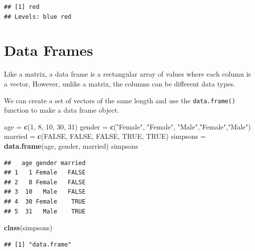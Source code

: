\documentclass[
]{book}
\newenvironment{Shaded}{\begin{snugshade}}{\end{snugshade}}
\newcommand{\DecValTok}[1]{\textcolor[rgb]{0.00,0.00,0.81}{#1}}
\newcommand{\KeywordTok}[1]{\textcolor[rgb]{0.13,0.29,0.53}{\textbf{#1}}}
\newcommand{\NormalTok}[1]{#1}
\newcommand{\OtherTok}[1]{\textcolor[rgb]{0.56,0.35,0.01}{#1}}
\newcommand{\StringTok}[1]{\textcolor[rgb]{0.31,0.60,0.02}{#1}}
\begin{document}
\begin{verbatim}
## [1] red
## Levels: blue red
\end{verbatim}

\hypertarget{data-frames}{%
\section{Data Frames}\label{data-frames}}

Like a matrix, a data frame is a rectangular array of values where each column is a vector, However, unlike a matrix, the columns can be different data types.

We can create a set of vectors of the same length and use the \texttt{data.frame()} function to make a data frame object.

\begin{Shaded}
\begin{Highlighting}[]
\NormalTok{age =}\StringTok{ }\KeywordTok{c}\NormalTok{(}\DecValTok{1}\NormalTok{, }\DecValTok{8}\NormalTok{, }\DecValTok{10}\NormalTok{, }\DecValTok{30}\NormalTok{, }\DecValTok{31}\NormalTok{)}
\NormalTok{gender =}\StringTok{ }\KeywordTok{c}\NormalTok{(}\StringTok{"Female"}\NormalTok{, }\StringTok{"Female"}\NormalTok{, }\StringTok{"Male"}\NormalTok{,}\StringTok{"Female"}\NormalTok{,}\StringTok{"Male"}\NormalTok{)}
\NormalTok{married =}\StringTok{ }\KeywordTok{c}\NormalTok{(}\OtherTok{FALSE}\NormalTok{, }\OtherTok{FALSE}\NormalTok{, }\OtherTok{FALSE}\NormalTok{, }\OtherTok{TRUE}\NormalTok{, }\OtherTok{TRUE}\NormalTok{)}
\NormalTok{simpsons =}\StringTok{ }\KeywordTok{data.frame}\NormalTok{(age, gender, married)}
\NormalTok{simpsons}
\end{Highlighting}
\end{Shaded}

\begin{verbatim}
##   age gender married
## 1   1 Female   FALSE
## 2   8 Female   FALSE
## 3  10   Male   FALSE
## 4  30 Female    TRUE
## 5  31   Male    TRUE
\end{verbatim}

\begin{Shaded}
\begin{Highlighting}[]
\KeywordTok{class}\NormalTok{(simpsons)}
\end{Highlighting}
\end{Shaded}

\begin{verbatim}
## [1] "data.frame"
\end{verbatim}
\end{document}
